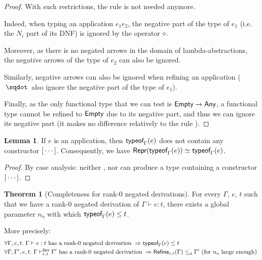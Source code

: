 \documentclass[a4paper]{article}
\theoremstyle{definition}
\newtheorem{theorem}{Theorem}
\newtheorem{lemma}{Lemma}
\begin{document}
  \begin{proof}
    With such restrictions, the rule  is not needed anymore.

    Indeed, when typing an application $e_1 e_2$, the negative part of the type of $e_1$ (i.e. the $N_i$ part of its DNF)
    is ignored by the operator $\circ$.

    Moreover, as there is no negated arrows in the domain of lambda-abstractions,
    the negative arrows of the type of $e_2$ can also be ignored.

    Similarly, negative arrows can also be ignored when refining an application ($\worra {} {}$ also ignore the negative part
    of the type of $e_1$).

    Finally, as the only functional type that we can test is $\textsf{Empty}\to \textsf{Any}$, a functional type
    cannot be refined to $\textsf{Empty}$ due to its negative part, and thus we can ignore its negative part
    (it makes no difference relatively to the rule ).
  \end{proof}

  \begin{lemma}
    If $e$ is an application, then $\textsf{typeof}_{\Gamma}(e)$ does not contain any constructor ${[}\cdots]$.
    Consequently, we have $\textsf{Repr}(\textsf{typeof}_{\Gamma}(e)) \simeq \textsf{typeof}_{\Gamma}(e)$.
  \end{lemma}

  \begin{proof}
    By case analysis: neither ,  nor  can produce a type
    containing a constructor ${[}\cdots]$.
  \end{proof}

  \begin{theorem}[Completeness for rank-0 negated derivations]
    For every $\Gamma$, $e$, $t$ such that we have a rank-0 negated derivation of $\Gamma \vdash e:t$, there exists a global parameter $n_o$
    with which $\textsf{typeof}_{\Gamma}(e) \leq t$.

    More precisely:
    \begin{align*}
      &\forall \Gamma, e, t.\ \Gamma \vdash e:t \text{ has a rank-0 negated derivation } \Rightarrow \textsf{typeof}_{\Gamma}(e) \leq t\\
      &\forall \Gamma, \Gamma', e, t.\ \Gamma \vdash^{\texttt{Env}}_{e,t} \Gamma' \text{ has a rank-0 negated derivation } \Rightarrow \textsf{Refine}_{e,t}(\Gamma) \leq_{\!\scriptscriptstyle\mathcal{A}} \Gamma' \text{ (for $n_o$ large enough)}
    \end{align*}
  \end{theorem}
\end{document}
